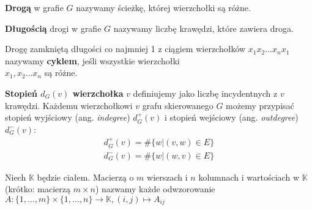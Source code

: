 \begin{definicja}[Droga]\label{def:droga}
\textbf{Drogą} w grafie \(G\) nazywamy ścieżkę, której wierzchołki są różne.
\end{definicja}

\begin{definicja}\label{def:dlugosc_drogi}
\textbf{Długością} drogi w grafie \(G\) nazywamy liczbę krawędzi, które zawiera droga.
\end{definicja}
\begin{definicja}[Cykl]\label{def:cykl_w_grafie}
Drogę zamkniętą długości co najmniej 1 z ciągiem wierzchołków \(x_1 x_2\dots x_n x_1\) nazywamy \textbf{cyklem}, jeśli wszystkie wierzchołki\\ \(x_1, x_2\dots x_n\) są różne.
\end{definicja}

\begin{definicja}\label{def:stopien_node}
\textbf{Stopień \(d_{G}(v)\) wierzchołka} \(v\) definiujemy jako liczbę incydentnych z \(v\) krawędzi. Każdemu wierzchołkowi \(v\) grafu skierowanego \(G\) możemy przypisać stopień wyjściowy (ang. \emph{indegree}) \(d_{G}^{+}(v)\) i stopień wejściowy (ang. \emph{outdegree}) \(d_{G}^{-}(v)\):
\begin{align*}
 d_{G}^{+}(v) = \#\{w|(v,w)\in E\}\\ 
 d_{G}^{-}(v) = \#\{w|(w,v)\in E\}
\end{align*}
\end{definicja}

\begin{definicja}[Macierz]\label{def:matrix}
Niech \(\mathbb{K}\) będzie ciałem. Macierzą o \(m\) wierszach i \(n\) kolumnach i wartościach w \(\mathbb{K}\) (krótko: macierzą \(m\times n\)) nazwamy każde odwzorowanie \(A:\{1,\dots, m\}\times \{1, \dots, n\}\xrightarrow{} \mathbb{K}, (i,j)\longmapsto A_{ij}\)
\end{definicja}